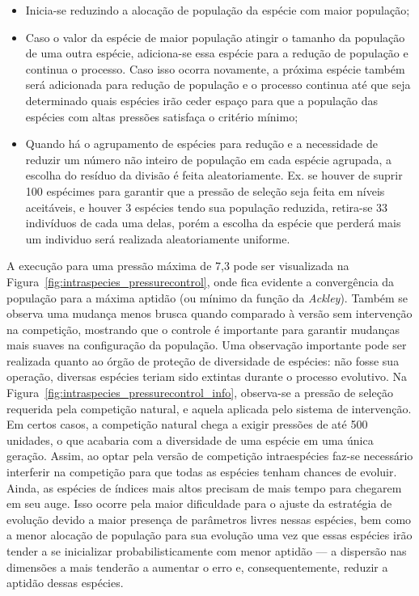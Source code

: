\begin{itemize}
\item Inicia-se reduzindo a alocação de população da espécie com maior
população;
\item Caso o valor da espécie de maior população atingir o tamanho da
população de uma outra espécie, adiciona-se essa espécie para a
redução de população e continua o processo. Caso isso ocorra
novamente, a próxima espécie também será adicionada para redução de
população e o processo continua até que seja determinado quais
espécies irão ceder espaço para que a população das espécies com altas
pressões satisfaça o critério mínimo;
\item Quando há o agrupamento de espécies para redução e a
necessidade de reduzir um número não inteiro de população em cada
espécie agrupada, a escolha do resíduo da divisão é feita
aleatoriamente. Ex. se houver de suprir 100 espécimes para garantir que
a pressão de seleção seja feita em níveis aceitáveis, e houver 3
espécies tendo sua população reduzida, retira-se 33 indivíduos de
cada uma delas, porém a escolha da espécie que perderá mais um
individuo será realizada aleatoriamente uniforme.
\end{itemize}

A execução para uma pressão máxima de 7,3 pode ser visualizada na
Figura~\ref{fig:intraspecies_pressurecontrol}, onde fica evidente a
convergência da população para a máxima aptidão (ou mínimo da função
da \emph{Ackley}). Também se observa uma mudança menos brusca quando
comparado à versão sem intervenção na competição, mostrando que o
controle é importante para garantir mudanças mais suaves na
configuração da população. Uma observação importante pode ser
realizada quanto ao órgão de proteção de diversidade de espécies: não
fosse sua operação, diversas espécies teriam sido extintas durante o
processo evolutivo. Na
Figura~\ref{fig:intraspecies_pressurecontrol_info}, observa-se a
pressão de seleção requerida pela competição natural, e aquela
aplicada pelo sistema de intervenção. Em certos casos, a competição
natural chega a exigir pressões de até 500 unidades, o que acabaria
com a diversidade de uma espécie em uma única geração. Assim, ao optar
pela versão de competição intraespécies faz-se necessário interferir
na competição para que todas as espécies tenham chances de evoluir.
Ainda, as espécies de índices mais altos precisam de mais tempo para
chegarem em seu auge. Isso ocorre pela maior dificuldade para o ajuste
da estratégia de evolução devido a maior presença de parâmetros livres
nessas espécies, bem como a menor alocação de população para sua
evolução uma vez que essas espécies irão tender a se inicializar
probabilisticamente com menor aptidão --- a dispersão nas dimensões a
mais tenderão a aumentar o erro e, consequentemente, reduzir a aptidão
dessas espécies.

